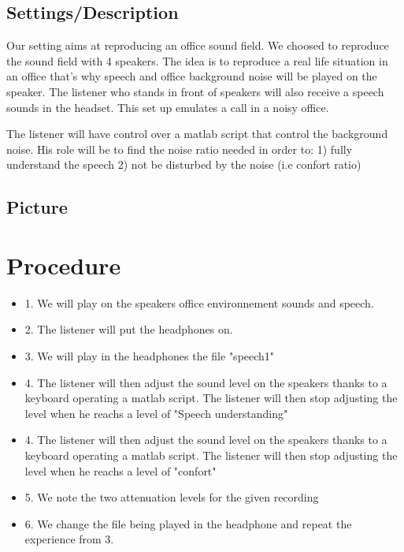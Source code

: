\documentclass[12pt,a4paper]{article}
\begin{document}
\subsection{Settings/Description}

Our setting aims at reproducing an office sound field. We choosed to reproduce the sound field with 4 speakers. 
The idea is to reproduce a real life situation in an office that's why speech and office background noise will be played on the speaker. 
The listener who stands in front of speakers will also receive a speech sounds in the headset. This set up emulates a call in a noisy office.

The listener will have control over a matlab script that control the background noise. His role will be to find the noise ratio needed in order to: 1) fully understand the speech 2) not be disturbed by the noise (i.e confort ratio)

\subsection{Picture}
\vspace{1cm}
\section{Procedure}

\begin{itemize}
\item 1. We will play on the speakers office environnement sounds and speech. 
\item 2. The listener will put the headphones on.
\item 3. We will play in the headphones the file "speech1"
\item 4. The listener will then adjust the sound level on the speakers thanks to a keyboard operating a matlab script. The listener will then stop adjusting the level when he reachs a level of "Speech understanding"
\item 4. The listener will then adjust the sound level on the speakers thanks to a keyboard operating a matlab script. The listener will then stop adjusting the level when he reachs a level of "confort"
\item 5. We note the two attenuation levels for the given recording
\item 6. We change the file being played in the headphone and repeat the experience from 3.
\end{itemize}

\vspace{1cm}
\end{document}
